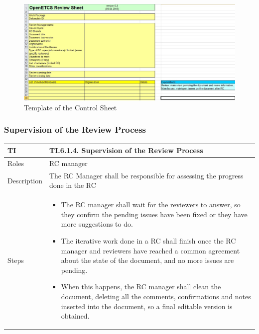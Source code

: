 \documentclass{template/openetcs_article}
\begin{document}
\begin{figure}
\centering
\includegraphics [width=\textwidth]{./figures/ControlSheet.JPG}
\caption{Template of the Control Sheet}
\end{figure}

\subsubsection{Supervision of the Review Process}

\begin{flushleft}
\tablefirsthead{}
\tablehead{}
\tabletail{}
\tablelasttail{}
\begin{supertabular}{|m{2cm}|m{13cm}|}
\hline
{}
TI & 
TI.6.1.4. Supervision of the Review Process
\\\hline
Roles &
RC manager
\\\hline
Description &
The RC Manager shall be responsible for assessing the progress done in the RC
\\\hline
Steps &
\begin{itemize}
\item The RC manager shall wait for the reviewers to answer, so they confirm the pending issues have been fixed or they have more suggestions to do.
\item The iterative work done in a RC shall finish once the RC manager and reviewers have reached a common agreement about the state of the document, and no more issues are pending. \item When this happens, the RC manager shall clean the document, deleting all the comments, confirmations and notes inserted into the document, so a final editable version is obtained.
\end{itemize}
\\\hline
\end{supertabular}
\end{flushleft}
\end{document}
